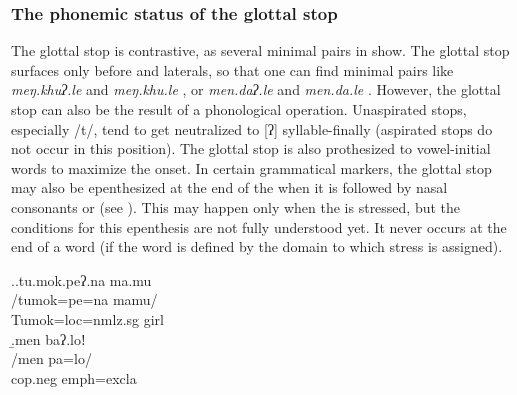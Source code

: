 \subsubsection{The phonemic status of the glottal stop}

The glottal stop is contrastive, as several minimal pairs in   show. The glottal stop surfaces only before  and laterals, so that one can find minimal pairs like  \emph{meŋ.khuʔ.le}  and \emph{meŋ.khu.le} , or \emph{men.daʔ.le}  and \emph{men.da.le} . However, the glottal stop can also be the result of a phonological operation. Unaspirated stops, especially /t/, tend to get neutralized to [ʔ] syllable-finally (aspirated stops do not occur in this position). The glottal stop is also prothesized to vowel-initial words to maximize the onset. In certain grammatical markers, the glottal stop may also  be epenthesized at the end of the  when it is followed by  nasal consonants or   (see \Next). This may happen only when the  is stressed, but the conditions for this epenthesis are not fully understood yet. It never occurs at the end of a word (if the word is defined by the domain to which stress is assigned). 

\ex.\a.\glll tu.mok.peʔ.na ma.mu\\
/tumok=pe=na mamu/\\
Tumok{\sc =loc=nmlz.sg} girl\\
\b.\glll men baʔ.loǃ\\
/men pa=lo/\\
{\sc cop.neg} {\sc emph=excla}\\


